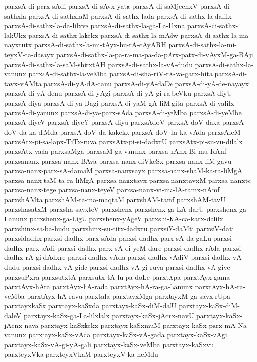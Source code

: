{parxsA-di-parx-sAdi
parxsA-di-sAvx-yata
parxsA-di-saMjecnxV
parxsA-di-sathxla
parxsA-di-sathxlaM
parxsA-di-sathx-lada
parxsA-di-sathx-la-dalilx
parxsA-di-sathx-la-da-lilxve
parxsA-di-sathx-la-ga-La-lilxna
parxsA-di-sathx-lakUkx
parxsA-di-sathx-lakekx
parxsA-di-sathx-la-mAdw
parxsA-di-sathx-la-ma-nayxtutx
parxsA-di-sathx-la-mi-tAyx-hu-rA-cAyARH
parxsA-di-sathx-la-mi-teyxV-ta-dasayx
parxsA-di-sathx-la-pa-ra-ma-pa-da-pArx-patx-di-vAyxM-ga-BAji
parxsA-di-sathx-la-saM-shirxtAH
parxsA-di-sathx-la-vA-dudu
parxsA-di-sathx-la-vanunx
parxsA-di-sathx-la-veMba
parxsA-di-sha-riV-rA-va-garx-hita
parxsA-di-tavx-vAMta
parxsA-di-yA-dA-tanu
parxsA-di-yA-daDe
parxsA-di-yA-de-nayayx
parxsA-di-yA-denu
parxsA-di-yAgi
parxsA-di-yA-gi-ra-beVku
parxsA-diyU
parxsA-diya
parxsA-di-ya-Dagi
parxsA-di-yaM-gA-liM-gita
parxsA-di-yalilx
parxsA-di-yanunx
parxsA-di-ya-parx-sAda
parxsA-di-yeMba
parxsA-di-yeMbe
parxsA-diyeV
parxsA-diyeY
parxsA-diyu
parxsAdoV
parxsA-doV-daka
parxsA-doV-da-ka-diMda
parxsA-doV-da-kakekx
parxsA-doV-da-ka-vAda
parxsAleM
parxsAtx-pi-sa-lapx-TiTx-ruva
parxsAtx-pi-si-dadxrU
parxsAtx-pi-su-vu-dilalx
parxsAtx-vada
parxsaMga
parxsaM-ga-vanunx
parxsa-nAnx-Bi-mu-KAnf
parxsananx
parxsa-nanx-BAva
parxsa-nanx-diVkeSx
parxsa-nanx-liM-gavu
parxsa-nanx-parx-sA-damaM
parxsa-nanxsayx
parxsa-nanx-shaM-ka-ra-liMgA
parxsa-nanx-taM-ta-ra-liMgA
parxsa-nanxtavx
parxsa-nanxtavxM
parxsa-nanxte
parxsa-nanx-tege
parxsa-nanx-teyeV
parxsa-nanx-vi-ma-lA-tamx-nAmf
parxshAMta
parxshAM-ta-ma-maqtaM
parxshAM-tamf
parxshAM-tavU
parxshasatxM
parxsha-sayxteV
parxshenx
parxshenx-ga-LA-darU
parxshenx-ga-Lanunx
parxshenx-ga-LigU
parxshenx-yAgeV
parxshi-KA-ca-karx-dalilx
parxshinx-sa-ba-hudu
parxshinx-su-titx-dadxru
parxsiV-daMti
parxsiV-dati
parxsidadhx
parxsi-dadhx-parx-sAda
parxsi-dadhx-parx-sA-da-gaLu
parxsi-dadhx-parx-sAdi
parxsi-dadhx-parx-sA-di-yeM-dare
parxsi-dadhx-rAda
parxsi-dadhx-rA-gi-dAdxre
parxsi-dadhx-vAda
parxsi-dadhx-vAdiV
parxsi-dadhx-vA-dudu
parxsi-dadhx-vA-gide
parxsi-dadhx-vA-gi-ruva
parxsi-dadhx-vA-give
parxsuPxra
parxsutxtA
parxsutx-tA-lu-pa-doLe
parxtApa
parxtAyx-gama
parxtAyx-hAra
parxtAyx-hA-rada
parxtAyx-hA-ra-ga-Lanunx
parxtAyx-hA-ra-veMba
parxtAyx-hA-ravu
parxtala
parxtayxMga
parxtayxM-ga-savx-rUpa
parxtayxkaSx
parxtayx-kaSxda
parxtayx-kaSx-diM-dalU
parxtayx-kaSx-diM-daleV
parxtayx-kaSx-ga-La-lilxlalx
parxtayx-kaSx-jAcnx-navU
parxtayx-kaSx-jAcnx-nava
parxtayx-kaSxkekx
parxtayx-kaSxmuM
parxtayx-kaSx-parx-mA-Na-vanunx
parxtayx-kaSx-vAda
parxtayx-kaSx-vA-gada
parxtayx-kaSx-vAgi
parxtayx-kaSx-vA-gi-yA-gali
parxtayx-kaSx-veMba
parxtayx-kaSxvu
parxteyxVka
parxteyxVkaM
parxteyxV-ka-neMdu
}
